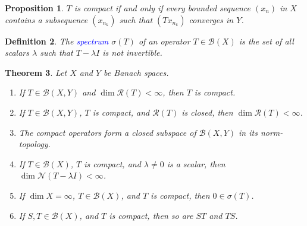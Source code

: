 \documentclass[11pt]{article}
\theoremstyle{thmstyle}
\newtheorem{theorem}{Theorem}[section]
\newtheorem{proposition}[theorem]{Proposition}
\theoremstyle{defstyle}
\newtheorem{definition}[theorem]{Definition}
\newcommand{\scrB}{\mathscr B}
\newcommand{\scrN}{\mathscr N}
\newcommand{\scrR}{\mathscr R}
\newcommand{\define}[1]{\textcolor{blue}{\textit{#1}}}
\begin{document}
\begin{proposition}
    $T$ is compact if and only if every bounded sequence $(x_n)$ in $X$ contains a subsequence $(x_{n_k})$ such that $(Tx_{n_k})$ converges in $Y$.
\end{proposition}

\begin{definition}
    The \define{spectrum} $\sigma(T)$ of an operator $T\in\scrB(X)$ is the set of all scalars $\lambda$ such that $T - \lambda I$ is not invertible.
\end{definition}

\begin{theorem}
    Let $X$ and $Y$ be Banach spaces. 
    \begin{enumerate}[label = (\alph*)]
        \item If $T\in\scrB(X, Y)$ and $\dim\scrR(T) < \infty$, then $T$ is compact.
        \item If $T\in\scrB(X, Y)$, $T$ is compact, and $\scrR(T)$ is closed, then $\dim\scrR(T) < \infty$.
        \item The compact operators form a closed subspace of $\scrB(X, Y)$ in its norm-topology. 
        \item If $T\in\scrB(X)$, $T$ is compact, and $\lambda\ne 0$ is a scalar, then $\dim\scrN(T - \lambda I) < \infty$.
        \item If $\dim X = \infty$, $T\in\scrB(X)$, and $T$ is compact, then $0\in\sigma(T)$.
        \item If $S, T\in\scrB(X)$, and $T$ is compact, then so are $ST$ and $TS$.
    \end{enumerate}
\end{theorem}
\end{document}
